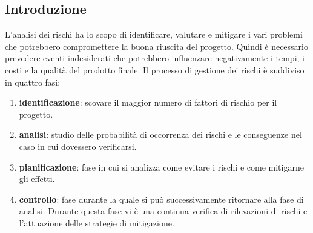 \subsection{Introduzione}
L'analisi dei rischi ha lo scopo di identificare, valutare e mitigare i vari problemi che potrebbero compromettere la buona riuscita del progetto. 
Quindi è necessario prevedere eventi indesiderati che potrebbero influenzare negativamente i tempi, i costi e la qualità del prodotto finale.
Il processo di gestione dei rischi è suddiviso in quattro fasi:
\begin{enumerate}
    \item \textbf{identificazione}: scovare il maggior numero di fattori di rischio per il progetto.
    \item \textbf{analisi}: studio delle probabilità di occorrenza dei rischi e le conseguenze nel caso in cui dovessero verificarsi.
    \item \textbf{pianificazione}: fase in cui si analizza come evitare i rischi e come mitigarne gli effetti.
    \item \textbf{controllo}: fase durante la quale si può successivamente ritornare alla fase di analisi.
    Durante questa fase vi è una continua verifica di rilevazioni di rischi e l'attuazione delle strategie di mitigazione. 
\end{enumerate}